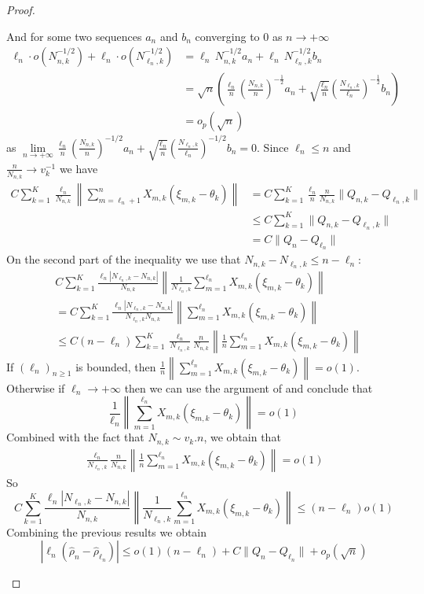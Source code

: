 \documentclass[11pt]{article}
\theoremstyle{plain}
\theoremstyle{definition}
\begin{document}
\begin{appendix}
\begin{proof}
\begin{enumerate}[label=(\roman*)]
		And for some two sequences $a_n$ and $b_n$ converging to $0$ as $n \to + \infty$
		\begin{align*}
			\ell_n\cdot o\left(N_{n,k}^{-1/2}\right)+\ell_n\cdot o\left(N_{\ell_n,k}^{-1/2}\right)
			&= \ell_n\,N_{n,k}^{-1/2}a_n + \ell_n \,N_{\ell_n,k}^{-1/2}b_n\\
			&= \sqrt{n}\left(\frac{\ell_n}{n}\left(\frac{N_{n,k}}{n}\right)^{-\frac{1}{2}}a_{n} + \sqrt{\frac{\ell_n}{n}}\left(\frac{N_{\ell_n,k}}{\ell_n}\right)^{-\frac{1}{2}}b_{n}\right)\\
			&= o_p(\sqrt{n})
		\end{align*}	
		as \quad \(\lim\limits_{n\to+\infty} \frac{\ell_n}{n}\left(\frac{N_{n,k}}{n}\right)^{-1/2}a_n + \sqrt{\frac{\ell_n}{n}}\left(\frac{N_{\ell_n,k}}{\ell_n}\right)^{-1/2}b_n=0\)\;. Since \(\ell_n \le n\) and \(\frac{n}{N_{n,k}}\to v_k^{-1}\) we have
		\begin{align*}
			C\sum_{k=1}^{K}\frac{\ell_n}{N_{n,k}}\left\|\sum_{m=\ell_n+1}^{n}X_{m,k}(\xi_{m,k}-\theta_k)\right\|
			&=C\sum_{k=1}^{K}\frac{\ell_n}{n}\frac{n}{N_{n,k}}\|Q_{n,k}-Q_{\ell_n,k}\|\\
			&\le C\sum_{k=1}^{K}\|Q_{n,k}-Q_{\ell_n,k}\|\\
			&= C\|Q_n-Q_{\ell_n}\|
		\end{align*}	
		On the second part of the inequality we use that \(N_{n,k} - N_{\ell_{n}, k} \leq n - \ell_n\):
		\begin{align*}
			&C\sum_{k=1}^{K}\frac{\ell_n|N_{\ell_n,k}-N_{n,k}|}{N_{n,k}}\left\|\frac{1}{N_{\ell_n,k}}\sum_{m=1}^{\ell_n}X_{m,k}(\xi_{m,k}-\theta_k)\right\|\\&= C\sum_{k=1}^{K}\frac{\ell_n|N_{\ell_n,k}-N_{n,k}|}{N_{\ell_n,k}N_{n,k}}\left\|\sum_{m=1}^{\ell_n}X_{m,k}(\xi_{m,k}-\theta_k)\right\|\\
			& \leq C(n-\ell_n) \sum_{k=1}^{K}\frac{\ell_n}{N_{\ell_n,k}}\frac{n}{N_{n,k}} \left\|\frac{1}{n}\sum_{m=1}^{\ell_n}X_{m,k}(\xi_{m,k}-\theta_k)\right\|
		\end{align*}
		If \((\ell_{n})_{n\geq1}\) is bounded, then \(\frac{1}{n}\left\|\sum_{m=1}^{\ell_n}X_{m,k}(\xi_{m,k}-\theta_k)\right\| = o(1)\). Otherwise if \(\ell_n \to +\infty\) then we can use the argument of \cite{Doob1936} and conclude that
		\[\frac{1}{\ell_n}\left\|\sum_{m=1}^{\ell_n}X_{m,k}(\xi_{m,k}-\theta_k)\right\| = o(1)\]
		Combined with the fact that \(N_{n,k} \sim v_k.n\), we obtain that
		\begin{align*}
			\frac{\ell_n}{N_{\ell_n,k}}\frac{n}{N_{n,k}}\left\|\frac{1}{n}\sum_{m=1}^{\ell_n}X_{m,k}(\xi_{m,k}-\theta_k)\right\| = o(1)
		\end{align*}
		So
		\begin{equation*}
			C\sum_{k=1}^{K}\frac{\ell_n|N_{\ell_n,k}-N_{n,k}|}{N_{n,k}}\left\|\frac{1}{N_{\ell_n,k}}\sum_{m=1}^{\ell_n}X_{m,k}(\xi_{m,k}-\theta_k)\right\| \leq (n-\ell_n) o(1)
		\end{equation*}
		Combining the previous results we obtain
		\[
		|\ell_n(\hat{\rho}_n - \hat{\rho}_{\ell_n})| \le o(1)(n-\ell_n) + C\|Q_n - Q_{\ell_n}\| + o_p(\sqrt{n})
		\]
	\end{enumerate}
\end{proof}


\end{appendix}
\end{document}

